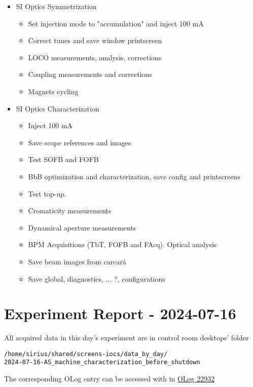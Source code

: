 \documentclass{article}
\newcommand{\pcheckmark}{\checkmark\makebox[0pt][r]{\normalfont\symbol{'26}}}
\begin{document}
\begin{itemize}
\begin{itemize}
\end{itemize}
\item SI Optics Symmetrization
\begin{itemize}
\item Set injection mode to "accumulation" and inject 100 mA
\item Correct tunes and save window printscreen \pcheckmark
\item LOCO measurements, analysis, corrections \checkmark
\item Coupling measurements and corrections
\item Magnets cycling
\end{itemize}
\item SI Optics Characterization
\begin{itemize}
\item Inject 100 mA \checkmark
\item Save scope references and images
\item Test SOFB and FOFB \checkmark
\item BbB optimization and characterization, save config and printscreens
\item Test top-up. \checkmark
\item Cromaticity measurements \checkmark
\item Dynamical aperture measurements
\item BPM Acquisitions (TbT, FOFB and FAcq). Optical analysis \checkmark
\item Save beam images from carcará \checkmark
\item Save global, diagnostics, ... ?, configurations \checkmark
\end{itemize}
\end{itemize}


\section{Experiment Report - 2024-07-16}

All acquired data in this day's experiment are in control room desktops' folder 
\begin{verbatim}
/home/sirius/shared/screens-iocs/data_by_day/
2024-07-16-AS_machine_characterization_before_shutdown
\end{verbatim}
The corresponding OLog entry can be accessed with in \href{https://ais-eng-srv-ta.cnpem.br/Olog/index.html#22932_2}{OLog 22932}
\end{document}
